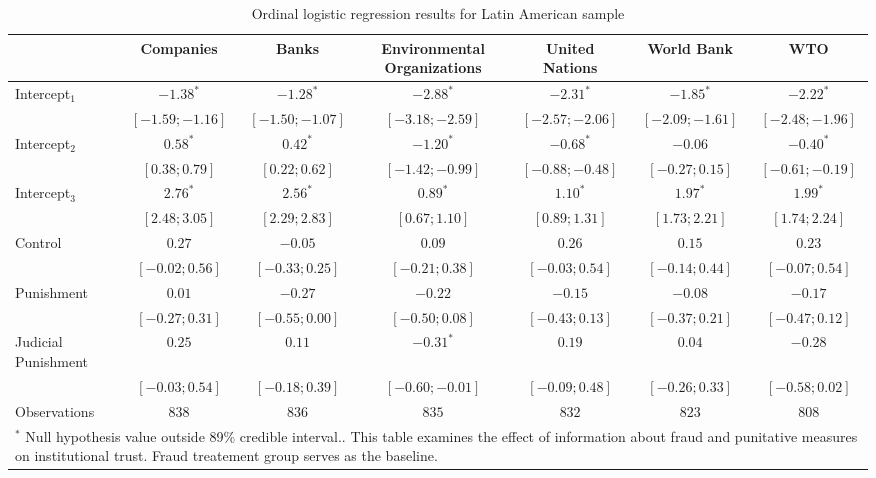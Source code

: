 \begin{table}
\begin{center}
\begin{tabular}{l c c c c c c}
\hline
 & Companies & Banks & Environmental Organizations & United Nations & World Bank & WTO \\
\hline
Intercept$_1$       & $-1.38^{*}$       & $-1.28^{*}$       & $-2.88^{*}$       & $-2.31^{*}$       & $-1.85^{*}$       & $-2.22^{*}$       \\
                    & $ [-1.59; -1.16]$ & $ [-1.50; -1.07]$ & $ [-3.18; -2.59]$ & $ [-2.57; -2.06]$ & $ [-2.09; -1.61]$ & $ [-2.48; -1.96]$ \\
Intercept$_2$       & $0.58^{*}$        & $0.42^{*}$        & $-1.20^{*}$       & $-0.68^{*}$       & $-0.06$           & $-0.40^{*}$       \\
                    & $ [ 0.38;  0.79]$ & $ [ 0.22;  0.62]$ & $ [-1.42; -0.99]$ & $ [-0.88; -0.48]$ & $ [-0.27;  0.15]$ & $ [-0.61; -0.19]$ \\
Intercept$_3$       & $2.76^{*}$        & $2.56^{*}$        & $0.89^{*}$        & $1.10^{*}$        & $1.97^{*}$        & $1.99^{*}$        \\
                    & $ [ 2.48;  3.05]$ & $ [ 2.29;  2.83]$ & $ [ 0.67;  1.10]$ & $ [ 0.89;  1.31]$ & $ [ 1.73;  2.21]$ & $ [ 1.74;  2.24]$ \\
Control             & $0.27$            & $-0.05$           & $0.09$            & $0.26$            & $0.15$            & $0.23$            \\
                    & $ [-0.02;  0.56]$ & $ [-0.33;  0.25]$ & $ [-0.21;  0.38]$ & $ [-0.03;  0.54]$ & $ [-0.14;  0.44]$ & $ [-0.07;  0.54]$ \\
Punishment          & $0.01$            & $-0.27$           & $-0.22$           & $-0.15$           & $-0.08$           & $-0.17$           \\
                    & $ [-0.27;  0.31]$ & $ [-0.55;  0.00]$ & $ [-0.50;  0.08]$ & $ [-0.43;  0.13]$ & $ [-0.37;  0.21]$ & $ [-0.47;  0.12]$ \\
Judicial Punishment & $0.25$            & $0.11$            & $-0.31^{*}$       & $0.19$            & $0.04$            & $-0.28$           \\
                    & $ [-0.03;  0.54]$ & $ [-0.18;  0.39]$ & $ [-0.60; -0.01]$ & $ [-0.09;  0.48]$ & $ [-0.26;  0.33]$ & $ [-0.58;  0.02]$ \\
\hline
Observations        & $838$             & $836$             & $835$             & $832$             & $823$             & $808$             \\
\hline
\multicolumn{7}{l}{\scriptsize{$^*$ Null hypothesis value outside 89\% credible interval..  This table examines the effect of information about fraud and punitative measures on institutional trust. Fraud treatement group serves as the baseline.}}
\end{tabular}
\caption{Ordinal logistic regression results for Latin American sample}
\label{table:coefficients}
\end{center}
\end{table}

